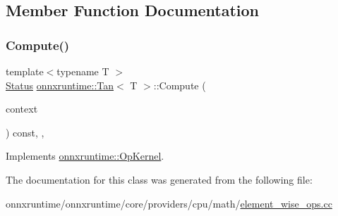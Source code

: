 \subsection{Member Function Documentation}
\mbox{\label{classonnxruntime_1_1Tan_ac5313e75705bbdcb234e1cbff21b1c66}} 
\subsubsection{\texorpdfstring{Compute()}{Compute()}}
{\footnotesize\ttfamily template$<$typename T $>$ \\
\mbox{\hyperlink{classonnxruntime_1_1common_1_1Status}{Status}} \mbox{\hyperlink{classonnxruntime_1_1Tan}{onnxruntime\+::\+Tan}}$<$ T $>$\+::Compute (\begin{DoxyParamCaption}\item[{\mbox{\hyperlink{classonnxruntime_1_1OpKernelContext}{Op\+Kernel\+Context}} $\ast$}]{context }\end{DoxyParamCaption}) const\hspace{0.3cm}{\ttfamily [inline]}, {\ttfamily [override]}, {\ttfamily [virtual]}}



Implements \mbox{\hyperlink{classonnxruntime_1_1OpKernel_a9eca8656a78b1b3ab9d3351a12798650}{onnxruntime\+::\+Op\+Kernel}}.



The documentation for this class was generated from the following file\+:\begin{DoxyCompactItemize}
\item 
onnxruntime/onnxruntime/core/providers/cpu/math/\mbox{\hyperlink{element__wise__ops_8cc}{element\+\_\+wise\+\_\+ops.\+cc}}\end{DoxyCompactItemize}
